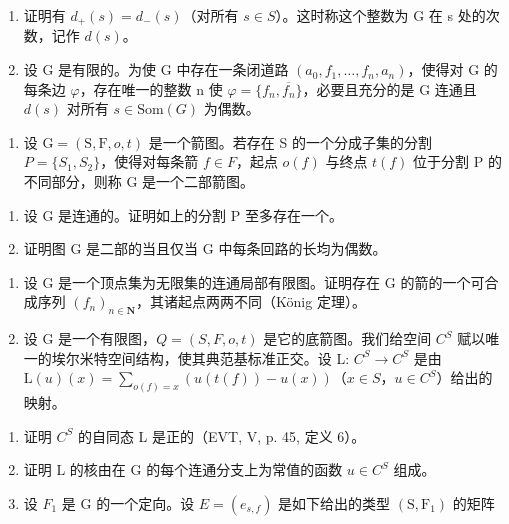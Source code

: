 \begin{enumerate}
\def\labelenumi{\alph{enumi})}
\item
  证明有 \(d_{+}(s) = d_{-}(s)\)（对所有 \(s \in S\)）。这时称这个整数为 G 在 s 处的次数，记作 \(d(s)\)。
\item
  设 G 是有限的。为使 G 中存在一条闭道路 \((a_{0}, f_{1}, \ldots, f_{n}, a_{n})\)，使得对 G 的每条边 \(\varphi\)，存在唯一的整数 n 使 \(\varphi = \{f_{n}, \overline{f_{n}}\}\)，必要且充分的是 G 连通且 \(d(s)\) 对所有 \(s \in \text{Som}(G)\) 为偶数。
\end{enumerate}

\begin{enumerate}
\def\labelenumi{\arabic{enumi})}
\setcounter{enumi}{1}
\tightlist
\item
  设 \(\mathrm{G} = (\mathrm{S}, \mathrm{F}, o, t)\) 是一个箭图。若存在 S 的一个分成子集的分割 \(P = \{S_{1}, S_{2}\}\)，使得对每条箭 \(f \in F\)，起点 \(o(f)\) 与终点 \(t(f)\) 位于分割 P 的不同部分，则称 G 是一个二部箭图。
\end{enumerate}

\begin{enumerate}
\def\labelenumi{\alph{enumi})}
\item
  设 G 是连通的。证明如上的分割 P 至多存在一个。
\item
  证明图 G 是二部的当且仅当 G 中每条回路的长均为偶数。
\end{enumerate}

\begin{enumerate}
\def\labelenumi{\arabic{enumi})}
\setcounter{enumi}{2}
\item
  设 G 是一个顶点集为无限集的连通局部有限图。证明存在 G 的箭的一个可合成序列 \((f_{n})_{n\in\mathbf{N}}\)，其诸起点两两不同（König 定理）。
\item
  设 G 是一个有限图，\(Q = (S, F, o, t)\) 是它的底箭图。我们给空间 \(C^{S}\) 赋以唯一的埃尔米特空间结构，使其典范基标准正交。设 L: \(C^{S} \to C^{S}\) 是由 \(\mathrm{L}(u)(x) = \sum_{o(f)=x} (u(t(f)) - u(x))\)（\(x \in S\)，\(u \in C^{S}\)）给出的映射。
\end{enumerate}

\begin{enumerate}
\def\labelenumi{\alph{enumi})}
\item
  证明 \(C^{S}\) 的自同态 L 是正的（EVT, V, p. 45, 定义 6）。
\item
  证明 L 的核由在 G 的每个连通分支上为常值的函数 \(u \in C^{S}\) 组成。
\item
  设 \(F_{1}\) 是 G 的一个定向。设 \(E = (e_{s,f})\) 是如下给出的类型 \((\mathrm{S}, \mathrm{F}_{1})\) 的矩阵
\end{enumerate}


